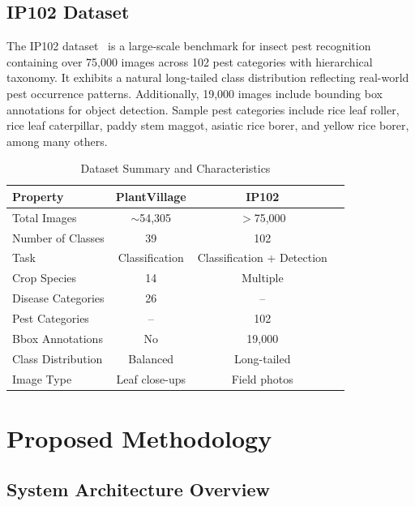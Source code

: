 \documentclass[conference]{IEEEtran}
\begin{document}
\subsection{IP102 Dataset}
The IP102 dataset~\cite{ip102_github} is a large-scale benchmark for insect pest recognition containing over 75,000 images across 102 pest categories with hierarchical taxonomy. It exhibits a natural long-tailed class distribution reflecting real-world pest occurrence patterns. Additionally, 19,000 images include bounding box annotations for object detection. Sample pest categories include rice leaf roller, rice leaf caterpillar, paddy stem maggot, asiatic rice borer, and yellow rice borer, among many others.

\begin{table}[htbp]
\caption{Dataset Summary and Characteristics}
\label{tab:datasets}
\centering
\renewcommand{\arraystretch}{1.1}
\begin{tabular}{@{}lccc@{}}
\toprule
\textbf{Property} & \textbf{PlantVillage} & \textbf{IP102} \\
\midrule
Total Images         & $\sim$54,305 & $>$75,000 \\
Number of Classes    & 39           & 102 \\
Task                 & Classification & Classification + Detection \\
Crop Species         & 14           & Multiple \\
Disease Categories   & 26           & -- \\
Pest Categories      & --           & 102 \\
Bbox Annotations     & No           & 19,000 \\
Class Distribution   & Balanced     & Long-tailed \\
Image Type           & Leaf close-ups & Field photos \\
\bottomrule
\end{tabular}
\end{table}

\section{Proposed Methodology}

\subsection{System Architecture Overview}
\end{document}
